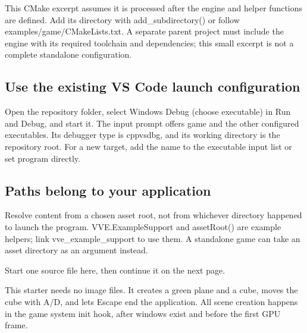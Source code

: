 \documentclass[11pt,a4paper]{article}
\begin{document}
This CMake excerpt assumes it is processed after the engine and helper functions are defined. Add its directory with add\_subdirectory() or follow examples/game/CMakeLists.txt. A separate parent project must include the engine with its required toolchain and dependencies; this small excerpt is not a complete standalone configuration.

\subsection*{Use the existing VS Code launch configuration}
Open the repository folder, select Windows Debug (choose executable) in Run and Debug, and start it. The input prompt offers game and the other configured executables. Its debugger type is cppvsdbg, and its working directory is the repository root. For a new target, add the name to the executable input list or set program directly.

\subsection*{Paths belong to your application}
Resolve content from a chosen asset root, not from whichever directory happened to launch the program. VVE.ExampleSupport and assetRoot() are example helpers; link vve\_example\_support to use them. A standalone game can take an asset directory as an argument instead.

\label{core-54}
Start one source file here, then continue it on the next page.

This starter needs no image files. It creates a green plane and a cube, moves the cube with A/D, and lets Escape end the application. All scene creation happens in the game system init hook, after windows exist and before the first GPU frame.
\end{document}
